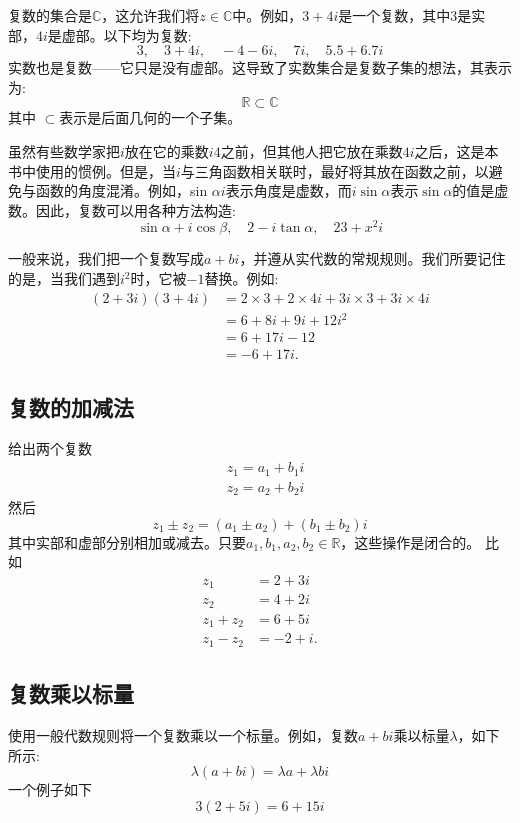 复数的集合是$\mathbb{C}$，这允许我们将$z \in \mathbb{C}$中。例如，$3+4 i$是一个复数，其中3是实部，$ 4i $是虚部。以下均为复数:
$$
  3, \quad 3+4 i, \quad-4-6 i, \quad 7 i, \quad 5.5+6.7 i
$$
实数也是复数——它只是没有虚部。这导致了实数集合是复数子集的想法，其表示为:
$$
  \mathbb{R} \subset \mathbb{C}
$$
其中 $\subset$表示是后面几何的一个子集。

虽然有些数学家把$i$放在它的乘数$i 4$之前，但其他人把它放在乘数$4 i$之后，这是本书中使用的惯例。但是，当$i$与三角函数相关联时，最好将其放在函数之前，以避免与函数的角度混淆。例如，sin $\alpha i$表示角度是虚数，而$i \sin \alpha$表示$\sin \alpha$的值是虚数。因此，复数可以用各种方法构造:
$$
  \sin \alpha+i \cos \beta, \quad 2-i \tan \alpha, \quad 23+x^{2} i
$$

一般来说，我们把一个复数写成$a+b i$，并遵从实代数的常规规则。我们所要记住的是，当我们遇到$i^{2}$时，它被$-1$替换。例如:
$$
  \begin{aligned}
    (2+3 i)(3+4 i) & =2 \times 3+2 \times 4 i+3 i \times 3+3 i \times 4 i \\
                   & =6+8 i+9 i+12 i^{2}                                  \\
                   & =6+17 i-12                                           \\
                   & =-6+17 i .
  \end{aligned}
$$

\subsection{复数的加减法}
给出两个复数
$$
  \begin{aligned}
     & z_{1}=a_{1}+b_{1} i \\
     & z_{2}=a_{2}+b_{2} i
  \end{aligned}
$$
然后
$$
  z_{1} \pm z_{2}=\left(a_{1} \pm a_{2}\right)+\left(b_{1} \pm b_{2}\right) i
$$
其中实部和虚部分别相加或减去。只要$a_{1}, b_{1}, a_{2}, b_{2} \in \mathbb{R}$，这些操作是闭合的。
比如
$$
  \begin{aligned}
    z_{1}       & =2+3 i  \\
    z_{2}       & =4+2 i  \\
    z_{1}+z_{2} & =6+5 i  \\
    z_{1}-z_{2} & =-2+i .
  \end{aligned}
$$

\subsection{复数乘以标量}
使用一般代数规则将一个复数乘以一个标量。例如，复数$a+b i$乘以标量$\lambda$，如下所示:
$$
  \lambda(a+b i)=\lambda a+\lambda b i
$$
一个例子如下
$$
  3(2+5 i)=6+15 i
$$

